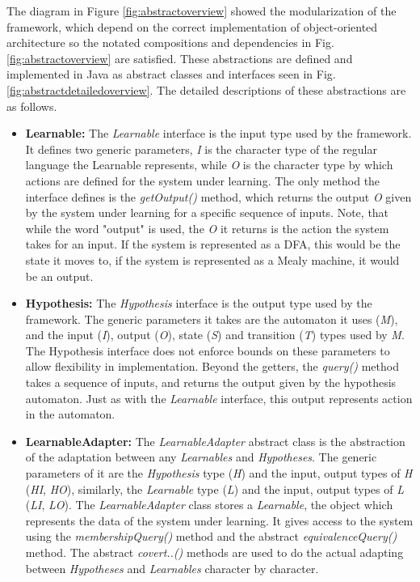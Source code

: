 The diagram in Figure \ref{fig:abstractoverview} showed the modularization of the framework, which depend on the correct implementation of object-oriented architecture so the notated compositions and dependencies in Fig. \ref{fig:abstractoverview} are satisfied. These abstractions are defined and implemented in Java as abstract classes and interfaces seen in Fig. \ref{fig:abstractdetailedoverview}. The detailed descriptions of these abstractions are as follows.
\\
\begin{itemize}
	\item \textbf{Learnable:} The \emph{Learnable} interface is the input type used by the framework. It defines two generic parameters, \emph{I} is the character type of the regular language the Learnable represents, while \emph{O} is the character type by which actions are defined for the system under learning. The only method the interface defines is the \emph{getOutput()} method, which returns the output \emph{O} given by the system under learning for a specific sequence of inputs. Note, that while the word "output" is used, the \emph{O} it returns is the action the system takes for an input. If the system is represented as a DFA, this would be the state it moves to, if the system is represented as a Mealy machine, it would be an output.
	
	\item \textbf{Hypothesis:} The \emph{Hypothesis} interface is the output type used by the framework. The generic parameters it takes are the automaton it uses (\emph{M}), and the input (\emph{I}), output (\emph{O}), state (\emph{S}) and transition (\emph{T}) types used by \emph{M}. The Hypothesis interface does not enforce bounds on these parameters to allow flexibility in implementation. Beyond the getters, the \emph{query()} method takes a sequence of inputs, and returns the output given by the hypothesis automaton. Just as with the \emph{Learnable} interface, this output represents action in the automaton.
	
	\item \textbf{LearnableAdapter:} The \emph{LearnableAdapter} abstract class is the abstraction of the adaptation between any \emph{Learnables} and \emph{Hypotheses}. The generic parameters of it are the \emph{Hypothesis} type (\emph{H}) and the input, output types of \emph{H} (\emph{HI}, \emph{HO}), similarly, the \emph{Learnable} type (\emph{L}) and the input, output types of \emph{L} (\emph{LI}, \emph{LO}). The \emph{LearnableAdapter} class stores a \emph{Learnable}, the object which represents the data of the system under learning. It gives access to the system using the \emph{membershipQuery()} method and the abstract \emph{equivalenceQuery()} method. The abstract \emph{covert..()} methods are used to do the actual adapting between \emph{Hypotheses} and \emph{Learnables} character by character.
	

\end{itemize}
